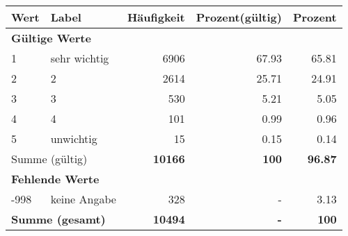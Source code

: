      \begin{longtable}{lXrrr}
     \toprule
     \textbf{Wert} & \textbf{Label} & \textbf{Häufigkeit} & \textbf{Prozent(gültig)} & \textbf{Prozent} \\
     \endhead
     \midrule
     \multicolumn{5}{l}{\textbf{Gültige Werte}}\\

     1 &
     \multicolumn{1}{X}{ sehr wichtig   } &


       \num{6906} &
       \num[round-mode=places,round-precision=2]{67.93} &
         \num[round-mode=places,round-precision=2]{65.81} \\

     2 &
     \multicolumn{1}{X}{ 2   } &


       \num{2614} &
       \num[round-mode=places,round-precision=2]{25.71} &
         \num[round-mode=places,round-precision=2]{24.91} \\

     3 &
     \multicolumn{1}{X}{ 3   } &


       \num{530} &
       \num[round-mode=places,round-precision=2]{5.21} &
         \num[round-mode=places,round-precision=2]{5.05} \\

     4 &
     \multicolumn{1}{X}{ 4   } &


       \num{101} &
       \num[round-mode=places,round-precision=2]{0.99} &
         \num[round-mode=places,round-precision=2]{0.96} \\

     5 &
     \multicolumn{1}{X}{ unwichtig   } &


       \num{15} &
       \num[round-mode=places,round-precision=2]{0.15} &
         \num[round-mode=places,round-precision=2]{0.14} \\
     \midrule
     \multicolumn{2}{l}{Summe (gültig)} &
       \textbf{\num{10166}} &
     \textbf{\num{100}} &
       \textbf{\num[round-mode=places,round-precision=2]{96.87}} \\
     \multicolumn{5}{l}{\textbf{Fehlende Werte}}\\
       -998 &
       keine Angabe &
         \num{328} &
        - &
         \num[round-mode=places,round-precision=2]{3.13} \\
     \midrule
     \multicolumn{2}{l}{\textbf{Summe (gesamt)}} &
          \textbf{\num{10494}} &
        \textbf{-} &
        \textbf{\num{100}} \\
     \bottomrule
     \end{longtable}
     
